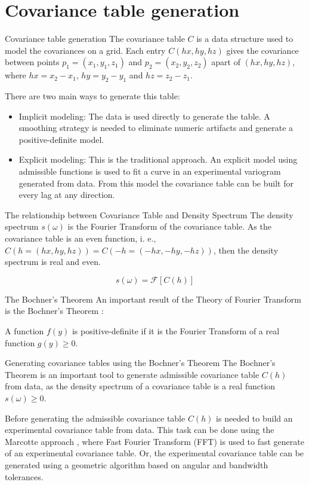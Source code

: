 \section{Covariance table generation}
\begin{frame}{Covariance table generation}
The covariance table $C$ is a data structure used to model the covariances on a grid. Each entry $C(hx,hy,hz)$ gives the covariance between points $p_1 = (x_1, y_1, z_1)$ and $p_2 = (x_2, y_2, z_2)$ apart of $(hx, hy, hz)$, where $hx = x_2 - x_1$, $hy = y_2 - y_1$ and $hz = z_2 - z_1$.

There are two main ways to generate this table:
\begin{itemize}
	\item Implicit modeling: The data is used directly to generate the table. A smoothing strategy is needed to eliminate numeric artifacts and generate a positive-definite model\cite{cov.paper}.
    \item Explicit modeling: This is the traditional approach. An explicit model using admissible functions is used to fit a curve in an experimental variogram generated from data. From this model the covariance table can be built for every lag at any direction.
\end{itemize}
\end{frame}

\begin{frame}{The relationship between Covariance Table and Density Spectrum}
The density spectrum $s(\omega)$ is the Fourier Transform of the covariance table. As the covariance table is an even function, i. e., $C(h=(hx,hy,hz))=C(-h=(-hx,-hy,-hz))$, then the density spectrum is real and even.

$$
s(\omega)=\mathscr{F}\left[ C(h) \right]
$$
\end{frame}

\begin{frame}{The Bochner's Theorem}
An important result of the Theory of Fourier Transform is the Bochner's Theorem \cite{bochner1939additive}:

\begin{block}{}
A function $f(y)$ is positive-definite if it is the Fourier Transform of a real function $g(y) \geq 0$.
\end{block}
\end{frame}

\begin{frame}{Generating covariance tables using the Bochner's Theorem}
The Bochner's Theorem is an important tool to generate admissible covariance table $C(h)$ from data, as the density spectrum of a covariance table is a real function $s(\omega) \geq 0$.

Before generating the admissible covariance table $C(h)$ is needed to build an experimental covariance table from data. This task can be done using the Marcotte approach \cite{fast.var.paper}, where Fast Fourier Transform (FFT) \cite{johnson2008implementing} is used to fast generate of an experimental covariance table. Or, the experimental covariance table can be generated using a geometric algorithm based on angular and bandwidth tolerances. 
\end{frame}


